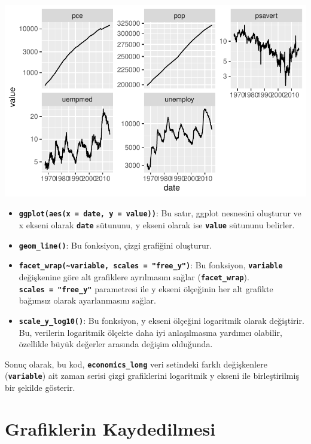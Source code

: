 \documentclass[
  letterpaper,
  DIV=11,
  numbers=noendperiod]{scrreprt}
\begin{document}
\includegraphics{ggplot2_files/figure-pdf/unnamed-chunk-26-1.pdf}

\begin{itemize}
\item
  \textbf{\texttt{ggplot(aes(x\ =\ date,\ y\ =\ value))}}: Bu satır,
  ggplot nesnesini oluşturur ve x ekseni olarak \textbf{\texttt{date}}
  sütununu, y ekseni olarak ise \textbf{\texttt{value}} sütununu
  belirler.
\item
  \textbf{\texttt{geom\_line()}}: Bu fonksiyon, çizgi grafiğini
  oluşturur.
\item
  \textbf{\texttt{facet\_wrap(\textasciitilde{}variable,\ scales\ =\ "free\_y")}}:
  Bu fonksiyon, \textbf{\texttt{variable}} değişkenine göre alt
  grafiklere ayrılmasını sağlar (\textbf{\texttt{facet\_wrap}}).
  \textbf{\texttt{scales\ =\ "free\_y"}} parametresi ile y ekseni
  ölçeğinin her alt grafikte bağımsız olarak ayarlanmasını sağlar.
\item
  \textbf{\texttt{scale\_y\_log10()}}: Bu fonksiyon, y ekseni ölçeğini
  logaritmik olarak değiştirir. Bu, verilerin logaritmik ölçekte daha
  iyi anlaşılmasına yardımcı olabilir, özellikle büyük değerler arasında
  değişim olduğunda.
\end{itemize}

Sonuç olarak, bu kod, \textbf{\texttt{economics\_long}} veri setindeki
farklı değişkenlere (\textbf{\texttt{variable}}) ait zaman serisi çizgi
grafiklerini logaritmik y ekseni ile birleştirilmiş bir şekilde
gösterir.

\section*{Grafiklerin Kaydedilmesi}\label{grafiklerin-kaydedilmesi}
\end{document}
